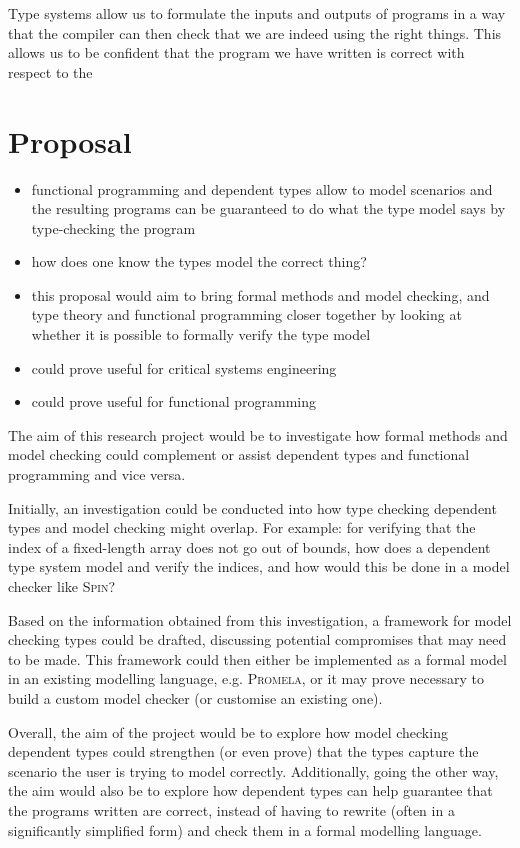 \documentclass[11pt]{article}
\begin{document}
    Type systems allow us to formulate the inputs and outputs of programs in a way that the compiler can then check that we are indeed using the right things. This allows us to be confident that the program we have written is correct with respect to the 
    
    \section*{Proposal}
    \begin{itemize}
        \item functional programming and dependent types allow to model scenarios and the resulting programs can be guaranteed to do what the type model says by type-checking the program
        \item how does one know the types model the correct thing?
        \item this proposal would aim to bring formal methods and model checking, and type theory and functional programming closer together by looking at whether it is possible to formally verify the type model
        \item could prove useful for critical systems engineering
        \item could prove useful for functional programming
    \end{itemize}
    
    The aim of this research project would be to investigate how formal methods and model checking could complement or assist dependent types and functional programming and vice versa.
    
    Initially, an investigation could be conducted into how type checking dependent types and model checking might overlap. For example: for verifying that the index of a fixed-length array does not go out of bounds, how does a dependent type system model and verify the indices, and how would this be done in a model checker like \textsc{Spin}?
    
    Based on the information obtained from this investigation, a framework for model checking types could be drafted, discussing potential compromises that may need to be made. This framework could then either be implemented as a formal model in an existing modelling language, e.g. \textsc{Promela}, or it may prove necessary to build a custom model checker (or customise an existing one).
    
    Overall, the aim of the project would be to explore how model checking dependent types could strengthen (or even prove) that the types capture the scenario the user is trying to model correctly. Additionally, going the other way, the aim would also be to explore how dependent types can help guarantee that the programs written are correct, instead of having to rewrite (often in a significantly simplified form) and check them in a formal modelling language.
    
    \newpage
    
    \printbibliography
    
\end{document}
